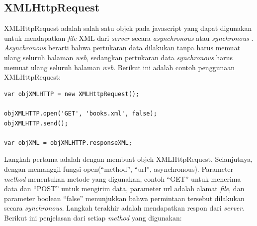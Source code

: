 \subsection{XMLHttpRequest}
XMLHttpRequest adalah salah satu objek pada javascript yang dapat digunakan
untuk mendapatkan \textit{file} XML dari \textit{server} secara \textit{asynchronous}
atau \textit{synchronous} \cite{Edmond:2006}. \textit{Asynchronous} berarti
bahwa pertukaran data dilakukan tanpa harus memuat ulang seluruh halaman \textit{web}, sedangkan 
pertukaran data \textit{synchronous} harus memuat ulang seluruh halaman
\textit{web}. Berikut ini adalah contoh penggunaan XMLHttpRequest:
\begin{verbatim}
var objXMLHTTP = new XMLHttpRequest();

objXMLHTTP.open('GET', 'books.xml', false);
objXMLHTTP.send();

var objXML = objXMLHTTP.responseXML;
\end{verbatim}
Langkah pertama adalah dengan membuat objek XMLHttpRequest. Selanjutnya, dengan
memanggil fungsi open(``method'', ``url'', asynchronous). Parameter
\textit{method} menentukan metode yang digunakan, contoh ``GET'' untuk menerima
data dan ``POST'' untuk mengirim data, parameter url adalah alamat
\textit{file}, dan parameter boolean ``false'' menunjukkan bahwa permintaan tersebut
dilakukan secara \textit{synchronous}. Langkah terakhir adalah mendapatkan
respon dari \textit{server}. Berikut ini penjelasan dari setiap \textit{method}
yang digunakan:
